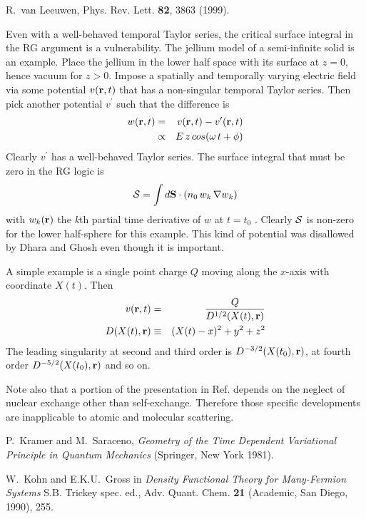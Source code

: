 \begin{references}
 R.~van Leeuwen, Phys. Rev. Lett. {\bf 82}, 3863 (1999).

 Even with a well-behaved temporal Taylor series, the
critical surface integral in the RG argument is a vulnerability. The jellium
model of a semi-infinite solid is an example. Place the jellium in the lower
half space with its surface at $z=0$, hence vacuum for $z>0$. Impose a
spatially and temporally varying electric field via some potential $v({\bf r}%
,t)$ that has a non-singular temporal Taylor series. Then pick another
potential $v^\prime$ such that the difference is 
\begin{eqnarray}
w({\bf r},t) & = & v({\bf r},t) - v^{\prime}({\bf r},t)  \nonumber \\
& \propto & E \, z \, cos(\omega \, t + \phi)  \nonumber
\end{eqnarray}
Clearly $v^\prime$ has a well-behaved Taylor series. The surface integral
that must be zero in the RG logic is 
\[
{\cal S} = \int d{\bf S}\cdot ( n_{0} \, w_{k} \, \nabla w_{k} ) %
\]
with $w_{k}({\bf r})$ the {\it k}th partial time derivative of $w$ at $t=t_0$
. Clearly ${\cal S}$ is non-zero for the lower half-sphere for this example.
This kind of potential was disallowed by Dhara and Ghosh \cite{Dhara87} even
though it is important.

 A simple example is a single point charge $Q$ moving
along the $x$-axis with coordinate $X(t)$. Then 
\begin{eqnarray}
v({\bf r},t) & = & \frac{Q}{D^{1/2}(X(t),{\bf r})}  \nonumber \\
D(X(t),{\bf r}) & \equiv & (X(t) -x)^{2} + y^{2} + z^{2}  \nonumber
\end{eqnarray}
The leading singularity at second and third order is $D^{-3/2}(X(t_{0}),{\bf %
r})$, at fourth order $D^{-5/2}(X(t_{0}),{\bf r})$ and so on.

 Note also that a portion of the presentation in Ref. %
 depends on the neglect of nuclear exchange other than
self-exchange. Therefore those specific developments are inapplicable to
atomic and molecular scattering.

 P.~Kramer and M.~Saraceno, {\it Geometry of the Time
Dependent Variational Principle in Quantum Mechanics} (Springer, New York
1981).

 W.~Kohn and E.K.U.~Gross in {\it Density Functional
Theory for Many-Fermion Systems} S.B. Trickey spec. ed., Adv. Quant. Chem. 
{\bf 21} (Academic, San Diego, 1990), 255.


\end{references}
